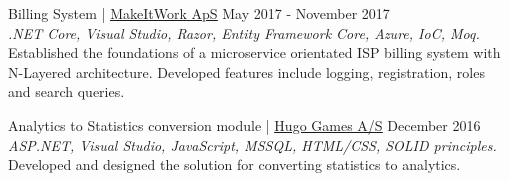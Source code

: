 \documentclass[margin, 10pt, hidelinks]{res} %
\newcommand{\tab}{\hspace*{1em}} %
\begin{document}
\begin{resume}
Billing System | \href{http://www.makeitwork.dk}{\underline{MakeItWork ApS}} \hfill May 2017  - November 2017\\
{\it .NET Core, Visual Studio, Razor, Entity Framework Core, Azure, IoC, Moq.} \\
\tab Established the foundations of a microservice orientated ISP billing system with N-Layered architecture. Developed features include logging, registration, roles and search queries.


Analytics to Statistics conversion module | \href{https://hugogames.com/}{\underline{Hugo Games A/S}} \hfill December 2016  \\
{\it ASP.NET, Visual Studio, JavaScript,  MSSQL, HTML/CSS, SOLID principles.}  \\
 \tab Developed and designed the solution for converting statistics to analytics.





\end{resume}
\end{document}

